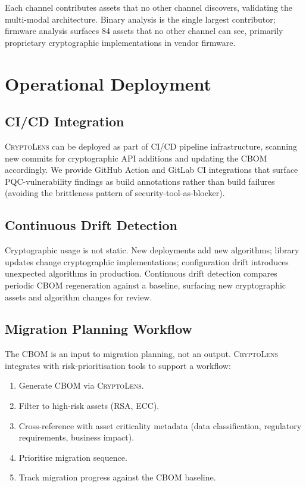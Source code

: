 \documentclass[sigconf,nonacm]{acmart}
\begin{document}
Each channel contributes assets that no other channel discovers,
validating the multi-modal architecture. Binary analysis is the
single largest contributor; firmware analysis surfaces 84 assets
that no other channel can see, primarily proprietary cryptographic
implementations in vendor firmware.

\section{Operational Deployment}

\subsection{CI/CD Integration}

\textsc{CryptoLens} can be deployed as part of CI/CD pipeline
infrastructure, scanning new commits for cryptographic API additions
and updating the CBOM accordingly. We provide GitHub Action and
GitLab CI integrations that surface PQC-vulnerability findings as
build annotations rather than build failures (avoiding the
brittleness pattern of security-tool-as-blocker).

\subsection{Continuous Drift Detection}

Cryptographic usage is not static. New deployments add new
algorithms; library updates change cryptographic implementations;
configuration drift introduces unexpected algorithms in production.
Continuous drift detection compares periodic CBOM regeneration
against a baseline, surfacing new cryptographic assets and
algorithm changes for review.

\subsection{Migration Planning Workflow}

The CBOM is an input to migration planning, not an output.
\textsc{CryptoLens} integrates with risk-prioritisation tools to
support a workflow:

\begin{enumerate}
  \item Generate CBOM via \textsc{CryptoLens}.
  \item Filter to high-risk assets (RSA, ECC).
  \item Cross-reference with asset criticality metadata
        (data classification, regulatory requirements, business
        impact).
  \item Prioritise migration sequence.
  \item Track migration progress against the CBOM baseline.
\end{enumerate}
\end{document}
